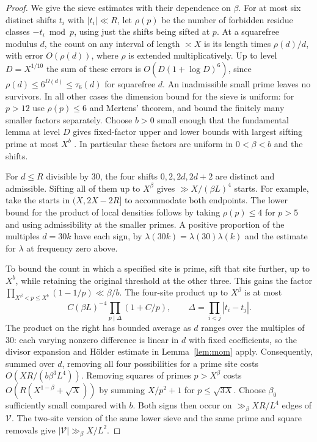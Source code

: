 \documentclass[11pt]{article}
\begin{document}
\begin{proof}
We give the sieve estimates with their dependence on $\beta$.
For at most six distinct shifts $t_i$ with $|t_i|\ll R$, let
$\rho(p)$ be the number of forbidden residue classes
$-t_i\bmod p$, using just the shifts being sifted at $p$.
At a squarefree modulus $d$, the count on any interval of length
$\asymp X$ is its length times $\rho(d)/d$, with error $O(\rho(d))$,
where $\rho$ is extended multiplicatively. Up to level $D=X^{1/10}$
the sum of these errors is $O(D(1+\log D)^6)$, since
$\rho(d)\le 6^{\Omega(d)}\le \tau_6(d)$ for squarefree $d$.
An inadmissible small prime leaves no survivors. In all other cases
the dimension bound for the sieve is uniform: for $p>12$ use
$\rho(p)\le6$ and Mertens' theorem, and bound the finitely many
smaller factors separately. Choose $b>0$ small enough that the
fundamental lemma at level $D$ gives fixed-factor upper and lower
bounds with largest sifting prime at most $X^b$
\cite[Theorem~6.9]{fi}. In particular these factors are uniform
in $0<\beta<b$ and the shifts.

For $d\le R$ divisible by $30$, the four shifts $0,2,2d,2d+2$
are distinct and admissible. Sifting all of them up to $X^\beta$
gives $\gg X/(\beta L)^4$ starts. For example, take the starts in
$(X,2X-2R]$ to accommodate both endpoints. The lower bound for
the product of local densities follows by taking
$\rho(p)\le4$ for $p>5$ and using admissibility at the smaller
primes. A positive proportion of the multiples $d=30k$ have each
sign, by $\lambda(30k)=\lambda(30)\lambda(k)$ and the estimate
for $\lambda$ at frequency zero above.

To bound the count in which a specified site is prime, sift that
site further, up to $X^b$, while retaining the original threshold
at the other three. This gains the factor
$\prod_{X^\beta<p\le X^b}(1-1/p)\ll\beta/b$.
The four-site product up to $X^\beta$ is at most
\[
 C(\beta L)^{-4}\prod_{p\mid\Delta}(1+C/p),
 \qquad \Delta=\prod_{i<j}|t_i-t_j|.
\]
The product on the right has bounded average as $d$ ranges over
the multiples of $30$: each varying nonzero difference is linear
in $d$ with fixed coefficients, so the divisor expansion and
H\"older estimate in Lemma~\ref{lem:mom} apply.
Consequently, summed over $d$, removing all four possibilities for
a prime site costs $O(XR/(b\beta^3L^4))$. Removing squares of
primes $p>X^\beta$ costs $O(R(X^{1-\beta}+\sqrt X))$ by summing
$X/p^2+1$ for $p\le\sqrt{3X}$. Choose $\beta_0$ sufficiently small
compared with $b$. Both signs then occur on $\gg_\beta XR/L^4$
edges of $\mathcal V$. The two-site version of the same lower
sieve and the same prime and square removals give
$|\mathcal V|\gg_\beta X/L^2$.


\end{proof}
\end{document}
